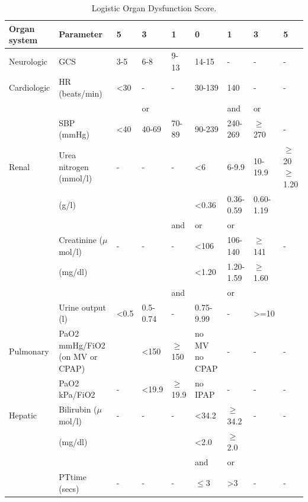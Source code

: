 \documentclass[12pt,a4paper,english
]{tunithesis}
\begin{document}
\begin{landscape}
    \begin{table}[ht]
    \begin{threeparttable}
        \caption{Logistic Organ Dysfunction Score.}
        \label{table:lods}
        \begin{tabular}{lllllllll}
            \hline
            \textbf{Organ system} & \textbf{Parameter} & \textbf{5} & \textbf{3} & \textbf{1} & \textbf{0} & \textbf{1} & \textbf{3} & \textbf{5} \\
            \hline
            Neurologic & GCS\tnote{1} & 3-5 & 6-8 & 9-13 & 14-15 & - & - & - \\
            Cardiologic & HR\tnote{2} (beats/min) & \textless 30 & - & - & 30-139 & 140 & - & - \\
             &  &  & or &  &  & and & or &  \\
             & SBP\tnote{3} (mmHg) & \textless 40 & 40-69 & 70-89 & 90-239 & 240-269 & $\geq$270 & - \\
            Renal & Urea nitrogen (mmol/l) & - & - & - & \textless{}6 & 6-9.9 & 10-19.9 & $\geq$20 $\geq$ 1.20 \\
             & (g/l) &  &  &  & \textless{}0.36 & 0.36-0.59 & 0.60-1.19 &  \\
             &  &  &  & and & or & or &  &  \\
             & Creatinine ($\mu$mol/l) & - & - & - & \textless{}106 & 106-140 & $\geq$141 & - \\
             & (mg/dl) &  &  &  & \textless{}1.20 & 1.20-1.59 & $\geq$1.60 &  \\
             &  &  &  & and &  & or &  &  \\
             & Urine output (l) & \textless{}0.5 & 0.5-0.74 & - & 0.75-9.99 & - & \textgreater{}=10 &  \\
            Pulmonary & PaO2 mmHg/FiO2 (on MV or CPAP) &  & \textless{}150 & $\geq$150 & no MV no CPAP & - & - & - \\
             & PaO2 kPa/FiO2 & - & \textless{}19.9 & $\geq$19.9 & no IPAP & - & - & - \\
            Hepatic & Bilirubin ($\mu$mol/l) & - & - & - & \textless{}34.2 & $\geq$34.2 & - & - \\
             & (mg/dl) &  &  &  & \textless{}2.0 & $\geq$2.0 &  &  \\
             &  &  &  &  & and & or &  &  \\
             & PT\tnote{4}time (secs) & - & - & - & $\leq$3 & \textgreater{}3 & - & - \\

\end{tabular}
\end{threeparttable}
\end{table}
\end{landscape}
\end{document}
